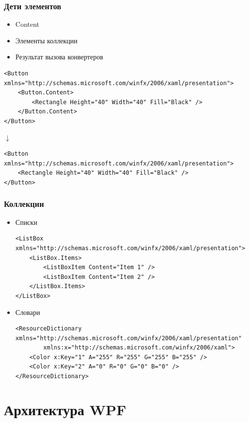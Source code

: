 \documentclass[xetex,mathserif,serif]{beamer}
\newcommand{\DownArrow} {
	\hspace{2cm}\begin{LARGE}$\downarrow$\end{LARGE}
}
\begin{document}
	\begin{frame}[fragile]
		\frametitle{Дети элементов}
		\begin{itemize}
			\item Content
			\item Элементы коллекции
			\item Результат вызова конвертеров
		\end{itemize}
		\vspace{3mm}
		\begin{scriptsize}
			\begin{verbatim}
<Button xmlns="http://schemas.microsoft.com/winfx/2006/xaml/presentation">
    <Button.Content>
        <Rectangle Height="40" Width="40" Fill="Black" />
    </Button.Content>
</Button>
			\end{verbatim}

			\DownArrow
			\begin{verbatim}
<Button xmlns="http://schemas.microsoft.com/winfx/2006/xaml/presentation">
    <Rectangle Height="40" Width="40" Fill="Black" />
</Button>
			\end{verbatim}
		\end{scriptsize}
	\end{frame}

	\begin{frame}[fragile]
		\frametitle{Коллекции}
		\begin{scriptsize}
			\begin{itemize}
				\item Списки
					\begin{verbatim}
<ListBox xmlns="http://schemas.microsoft.com/winfx/2006/xaml/presentation">
    <ListBox.Items>
        <ListBoxItem Content="Item 1" />
        <ListBoxItem Content="Item 2" />
    </ListBox.Items>
</ListBox>
					\end{verbatim}
				\item Словари
					\begin{verbatim}
<ResourceDictionary xmlns="http://schemas.microsoft.com/winfx/2006/xaml/presentation"
        xmlns:x="http://schemas.microsoft.com/winfx/2006/xaml">
    <Color x:Key="1" A="255" R="255" G="255" B="255" />
    <Color x:Key="2" A="0" R="0" G="0" B="0" />
</ResourceDictionary>
					\end{verbatim}
			\end{itemize}
		\end{scriptsize}
	\end{frame}

	\section{Архитектура WPF}
\end{document}
